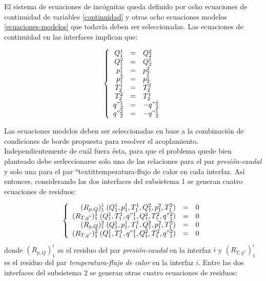 El sistema de ecuaciones de incógnitas queda definido por ocho ecuaciones de continuidad de variables \ref{continuidad}
y otras ocho ecuaciones modelos \ref{ecuaciones-modelos} que todavía deben ser seleccionadas.
Las ecuaciones de continuidad en las interfaces implican que:

\begin{equation}
\left\{ \begin{array}{rcl}
Q_1^1&=& Q_2^2 \\
Q_1^2&=& Q_2^1 \\
p_1^1&=& p_2^2 \\
p_1^2&=& p_2^1 \\
T_2^1&=& T_2^2 \\
T_2^2&=& T_2^1 \\
q"_2^1&=& - q"_2^2 \\
q"_2^2&=& - q"_2^1
\end{array}
\right.
\end{equation}

Las ecuaciones modelos deben ser seleccionadas en base a la combinación de condiciones de borde propuesta para resolver el acoplamiento.
Independientemente de cuál fuera ésta,
para que el problema quede bien planteado debe serleccionarse solo una de las relaciones para el par \textit{presión-caudal}
y solo una para el par ºtextit{temperatura-flujo de calor} en cada interfaz.
Así entonces, considerando las dos interfaces del subsistema 1 se generan cuatro ecuaciones de residuos:

\begin{equation}
\left\{ \begin{array}{rcl}
(R_{p,Q})_{1}^{1}  \;(Q_1^1, p_1^1, T_1^1, Q_1^2, p_1^2, T_1^2) &=& 0 \\
(R_{T,q"})_{1}^{1} \;(Q_1^1, T_1^1, q"_1^1, Q_1^2, T_1^2, q"_1^2) &=& 0 \\
(R_{p,Q})_{1}^{2}  \;(Q_1^1, p_1^1, T_1^1, Q_1^2, p_1^2, T_1^2) &=& 0 \\
(R_{T,q"})_{1}^{2} \;(Q_1^1, T_1^1, q"_1^1, Q_1^2, T_1^2, q"_1^2) &=& 0 
\end{array}
\right.
\label{residuos-1}
\end{equation}
donde $(R_{p,Q})_1^i$ es el residuo del par \textit{presión-caudal} en la interfaz $i$ y
$(R_{T,q''})_1^i$ es el residuo del par \textit{temperatura-flujo de calor} en la interfaz $i$.
Entre las dos interfaces del subsistema 2 se generan otras cuatro ecuaciones de residuos:

